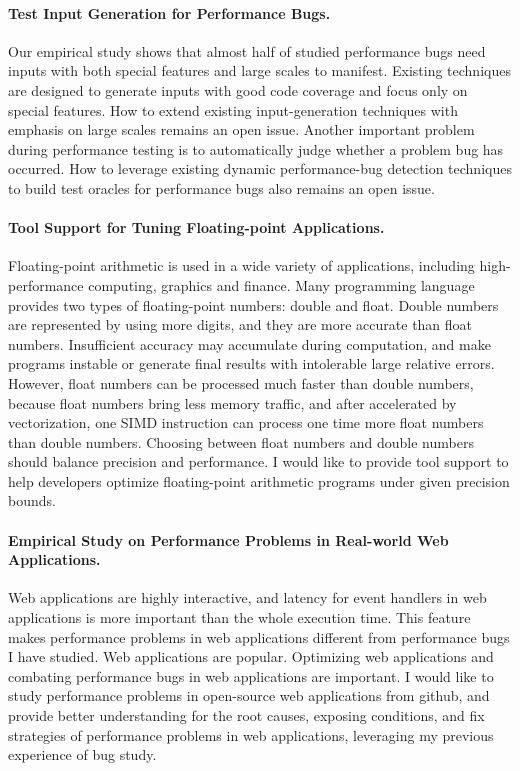 \documentclass[10pt]{article}
\begin{document}
\paragraph{Test Input Generation for Performance Bugs.}
Our empirical study shows that almost half of studied performance bugs need inputs with both special features and large scales to manifest. 
Existing techniques are designed to generate inputs with good code coverage and focus only on special features.
How to extend existing input-generation techniques with emphasis on large scales remains an open issue. 
Another important problem during performance testing is to automatically judge whether a problem bug has occurred. 
How to leverage existing dynamic performance-bug detection techniques to build test oracles for performance bugs also remains an open issue.

\paragraph{Tool Support for Tuning Floating-point Applications.}
Floating-point arithmetic is used in a wide variety of applications, 
including high-performance computing, graphics and finance. 
Many programming language provides two types of floating-point numbers: double and float. 
Double numbers are represented by using more digits, and they are more accurate than float numbers. 
Insufficient accuracy may accumulate during computation, 
and make programs instable or generate final results with intolerable large relative errors. 
However, float numbers can be processed much faster than double numbers, 
because float numbers bring less memory traffic, 
and after accelerated by vectorization, one SIMD instruction can process one time more float numbers than double numbers. 
Choosing between float numbers and double numbers should balance precision and performance. 
I would like to provide tool support to help developers optimize floating-point arithmetic programs under given precision bounds. 

\paragraph{Empirical Study on  Performance Problems in Real-world Web Applications.}
Web applications are highly interactive, 
and latency for event handlers in web applications is more important than the whole execution time. 
This feature makes performance problems in web applications different from performance bugs I have studied. 
Web applications are popular. 
Optimizing web applications and combating performance bugs in web applications are important. 
I would like to study performance problems in open-source web applications from github, 
and provide better understanding for the root causes, 
exposing conditions, and fix strategies of performance problems in web applications, 
leveraging my previous experience of bug study. 







\newpage


\end{document}
